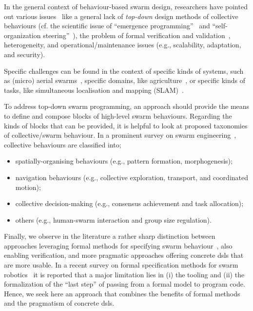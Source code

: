 In the general context of behaviour-based swarm design,
 researchers have pointed out various issues~\cite{DBLP:journals/swarm/BrambillaFBD13,DBLP:journals/scirobotics/TheraulazT20}
 like a general lack
 of \emph{top-down} design methods of collective behaviours
 (cf. the scientific issue of ``emergence programming''~\cite{varenne2015programming-emergence} and  ``self-organization steering''~\cite{DBLP:journals/alife/GershensonTWS20}),
 the problem of formal verification and validation~\cite{DBLP:journals/csur/LuckcuckFDDF19},
 heterogeneity, 
 and operational/maintenance issues
 (e.g., scalability, adaptation, and security). 

Specific challenges can be found in the context of 
specific kinds of systems,
such as (micro) aerial swarms~\cite{Abdelkader2021aerialswarms,%
Coppola2020microairswarms},
specific domains,
like agriculture~\cite{DBLP:journals/cea/AlbieroGUP22},
or specific kinds of tasks,
like simultaneous localisation and mapping (SLAM)~\cite{Kegeleirs2021slam}.


To address %
 top-down swarm programming,
 an approach should provide
 the means to define and compose 
 blocks of high-level swarm behaviours.%
%
Regarding the kinds of blocks that can be provided,
 it is helpful to look at proposed taxonomies of collective/swarm behaviour.
%
In a prominent survey on swarm engineering~\cite{DBLP:journals/swarm/BrambillaFBD13},
 collective behaviours are classified into;
\begin{itemize}
  \item spatially-organising behaviours (e.g., pattern formation, morphogenesis);
  \item navigation behaviours (e.g., collective exploration, transport, and coordinated motion);
  \item collective decision-making (e.g., consensus achievement and task allocation);
  \item others (e.g., human-swarm interaction and group size regulation).
\end{itemize} 
Finally, we observe in the literature 
 a rather sharp distinction
 between approaches leveraging
 formal methods for specifying swarm behaviour~\cite{DBLP:journals/csur/LuckcuckFDDF19},
 also enabling verification,
 and more pragmatic approaches
 offering concrete \acp{dsl} 
 that are more usable.
%
In a recent survey on formal specification methods for swarm robotics~\cite{DBLP:journals/csur/LuckcuckFDDF19}
 it is reported that a major limitation lies in (i) the tooling and (ii) the formalization of the ``last step'' of passing from a formal model to program code.
%
Hence, we seek here an approach that combines the benefits of formal methods and the pragmatism of concrete \acp{dsl}.

